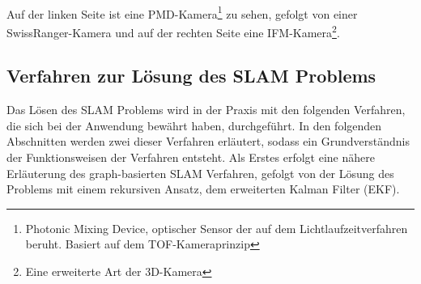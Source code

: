 \\ 
Auf der linken Seite ist eine PMD-Kamera\footnote{Photonic Mixing Device, optischer Sensor der auf dem Lichtlaufzeitverfahren beruht. Basiert auf dem TOF-Kameraprinzip} 
zu sehen, gefolgt von einer SwissRanger-Kamera und auf der rechten Seite eine IFM-Kamera\footnote{Eine erweiterte Art der 3D-Kamera}.

\subsection{Verfahren zur Lösung des SLAM Problems}
Das Lösen des \acs{SLAM} Problems wird in der Praxis mit den folgenden Verfahren, die sich bei der Anwendung bewährt haben, durchgeführt. In den 
folgenden Abschnitten werden zwei dieser Verfahren erläutert, sodass ein Grundverständnis der Funktionsweisen der Verfahren entsteht. 
Als Erstes erfolgt eine nähere Erläuterung des graph-basierten \acs{SLAM} Verfahren, gefolgt von der Lösung des Problems mit einem rekursiven 
Ansatz, dem erweiterten Kalman Filter (\acs{EKF}).

